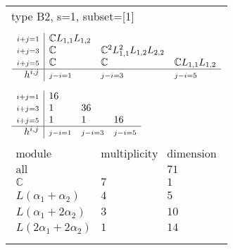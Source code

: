 \documentclass[crop,border=2mm]{standalone}
\begin{document}
\begin{tabular}{l}
{\huge type B2, s=1, subset=[1]}\\ \\


$\displaystyle
\begin{array}{r|l l l}
	{\scriptstyle i+j=1}&\mathbb{C}L_{1,1}L_{1,2}&&\\
	{\scriptstyle i+j=3}&\mathbb{C}&\mathbb{C}^{2}L_{1,1}^{2}L_{1,2}L_{2,2}&\\
	{\scriptstyle i+j=5}&\mathbb{C}&\mathbb{C}&\mathbb{C}L_{1,1}L_{1,2}\\
	\hline h^{i,j}&{\scriptstyle j-i=1}&{\scriptstyle j-i=3}&{\scriptstyle j-i=5}
\end{array}
$ \\ \\


$\displaystyle
\begin{array}{r|l l l}
	{\scriptstyle i+j=1}&16&&\\
	{\scriptstyle i+j=3}&1&36&\\
	{\scriptstyle i+j=5}&1&1&16\\
	\hline h^{i,j}&{\scriptstyle j-i=1}&{\scriptstyle j-i=3}&{\scriptstyle j-i=5}
\end{array}
$ \\ \\


$\displaystyle
\begin{array}{rll}
	\text{module}&\text{multiplicity}&\text{dimension} \\ \hline \text{all}&&71 \\
	\mathbb{C}&7&1\\
	L\left(\alpha_{1}+\alpha_{2}\right)&4&5\\
	L\left(\alpha_{1}+ 2\alpha_{2}\right)&3&10\\
	L\left( 2\alpha_{1}+ 2\alpha_{2}\right)&1&14
\end{array}
$ \\ \\

\end{tabular}
\end{document}

